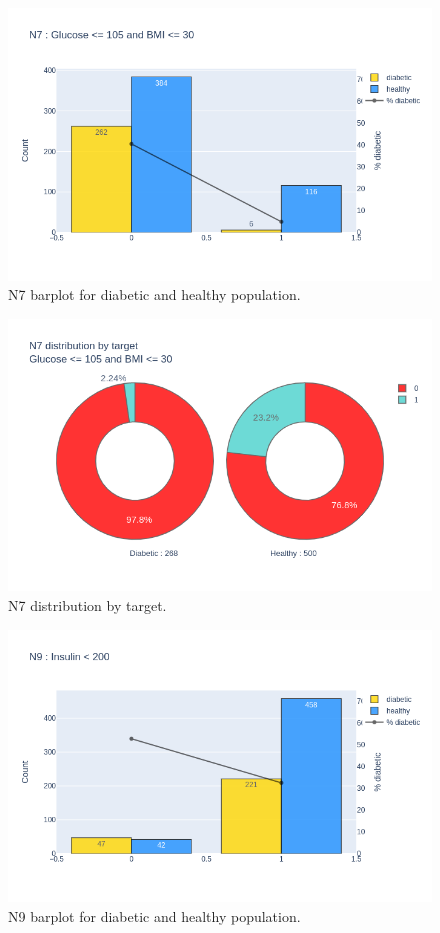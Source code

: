 \documentclass[12pt]{article}
\begin{document}
\begin{figure}[ht]
\centering
\includegraphics[width=1\textwidth]{newplot(29).png}
\caption{\label{fig:39} N7 barplot for diabetic and healthy population.}
\end{figure}

\begin{figure}[ht]
\centering
\includegraphics[width=1\textwidth]{newplot(30).png}
\caption{\label{fig:40} N7 distribution by target.}
\end{figure}

\begin{figure}[ht]
\centering
\includegraphics[width=1\textwidth]{newplot(32).png}
\caption{\label{fig:41} N9 barplot for diabetic and healthy population.}
\end{figure}
\end{document}
